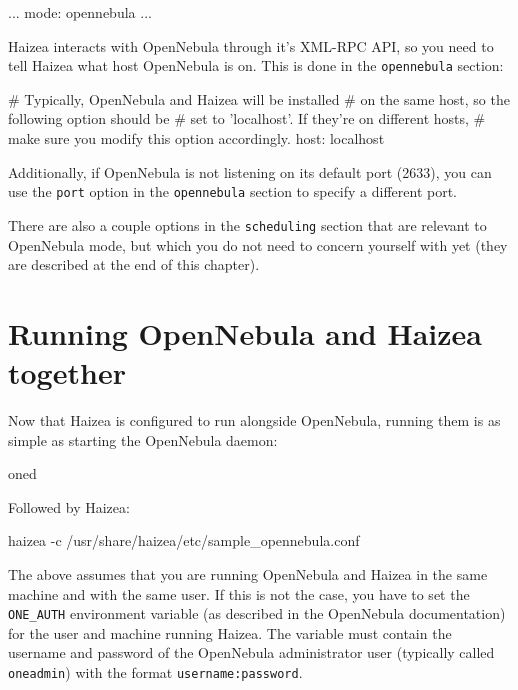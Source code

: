 \begin{wideshellverbatim}
[general]
...
mode: opennebula
...
\end{wideshellverbatim}

Haizea interacts with OpenNebula through it's XML-RPC API, so you need to tell Haizea what host OpenNebula is on. This is done in the \texttt{opennebula} section:

\begin{wideshellverbatim}
[opennebula]
# Typically, OpenNebula and Haizea will be installed
# on the same host, so the following option should be
# set to 'localhost'. If they're on different hosts,
# make sure you modify this option accordingly.
host: localhost
\end{wideshellverbatim}

Additionally, if OpenNebula is not listening on its default port (2633), you can use the \texttt{port} option in the \texttt{opennebula} section to specify a different port.

There are also a couple options in the \texttt{scheduling} section that are relevant to OpenNebula mode, but which you do not need to concern yourself with yet (they are described at the end of this chapter).

\section{Running OpenNebula and Haizea together}

Now that Haizea is configured to run alongside OpenNebula, running them is as simple as starting the OpenNebula daemon:

\begin{wideshellverbatim}
oned
\end{wideshellverbatim}

Followed by Haizea:

\begin{wideshellverbatim}
haizea -c /usr/share/haizea/etc/sample_opennebula.conf
\end{wideshellverbatim}

The above assumes that you are running OpenNebula and Haizea in the same machine and with the same user. If this is not the case, you have to set the \texttt{ONE\_AUTH} environment variable (as described in the OpenNebula documentation) for the user and machine running Haizea. The variable must contain the username and password of the OpenNebula administrator user (typically called \texttt{oneadmin}) with the format \texttt{username:password}. 

